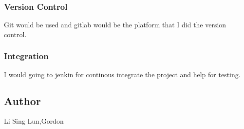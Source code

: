 \subsubsection*{Version Control}

Git would be used and gitlab would be the platform that I did the version control.

\subsubsection*{Integration}

I would going to jenkin for continous integrate the project and help for testing.

\subsection*{Author}

Li Sing Lun,Gordon 